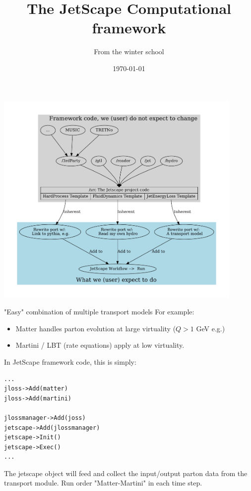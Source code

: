 \documentclass[11pt]{beamer}
\author{From the winter school}
\title{The JetScape Computational framework}
\date{\today}
\begin{document}
\begin{frame}
\titlepage
\end{frame}


\begin{frame}
\begin{center}
\includegraphics[width=0.9\textwidth]{./framework.pdf}
\end{center}
\end{frame}

\begin{frame}[fragile]{"Easy" combination of multiple transport models}
For example:
\begin{itemize}
\item Matter handles parton evolution at large virtuality ($Q > 1$ GeV e.g.)
\item Martini / LBT (rate equations) apply at low virtuality.
\end{itemize}
In JetScape framework code, this is simply:
\begin{lstlisting}
...
jloss->Add(matter)
jloss->Add(martini)

jlossmanager->Add(joss)
jetscape->Add(jlossmanager)
jetscape->Init()
jetscape->Exec()
...
\end{lstlisting}
The jetscape object will feed and collect the input/output parton data from the transport module. Run order "Matter-Martini" in each time step.

\end{frame}
\end{document}
